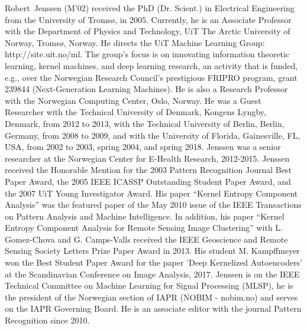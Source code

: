 \documentclass[journal]{IEEEtran}
\begin{document}
\begin{IEEEbiography}{Robert~Jenssen}
(M’02) received the PhD (Dr. Scient.) in Electrical Engineering from the University of Troms{\o}, in 2005.
Currently, he is an Associate Professor with the Department of Physics and Technology, UiT The Arctic University of Norway, Troms{\o}, Norway. He directs the UiT Machine Learning Group: http://site.uit.no/ml. The group's focus is on innovating information theoretic learning, kernel machines, and deep learning research, an activity that is funded, e.g., over the Norwegian Research Council's prestigious FRIPRO program, grant 239844 (Next-Generation Learning Machines). He is also a Research Professor with the Norwegian Computing Center, Oslo, Norway. He was a Guest Researcher with the Technical University of Denmark, Kongens Lyngby, Denmark, from 2012 to 2013, with the Technical University of Berlin, Berlin, Germany, from 2008 to 2009, and with the University of Florida, Gainesville, FL, USA, from 2002 to 2003, spring 2004, and spring 2018. Jenssen was a senior researcher at the Norwegian Center for E-Health Research, 2012-2015. Jenssen received the Honorable Mention for the 2003 Pattern Recognition Journal Best Paper Award, the 2005 IEEE ICASSP Outstanding Student Paper Award, and the 2007 UiT Young Investigator Award. His paper “Kernel Entropy Component Analysis” was the featured paper of the May 2010 issue of the IEEE Transactions on Pattern Analysis and Machine Intelligence. In addition, his paper “Kernel Entropy Component Analysis for Remote Sensing Image Clustering” with L. Gomez-Chova and G. Camps-Valls received the IEEE Geoscience and Remote Sensing Society Letters Prize Paper Award in 2013. His student M. Kampffmeyer won the Best Student Paper Award for the paper 'Deep Kernelized Autoencoders' at the Scandinavian Conference on Image Analysis, 2017. Jenssen is on the IEEE Technical Committee on Machine Learning for Signal Processing (MLSP), he is the president of the Norwegian section of IAPR (NOBIM - nobim.no) and serves on the IAPR Governing Board. He is an associate editor with the journal Pattern Recognition since 2010. 
\end{IEEEbiography}

\end{document}
